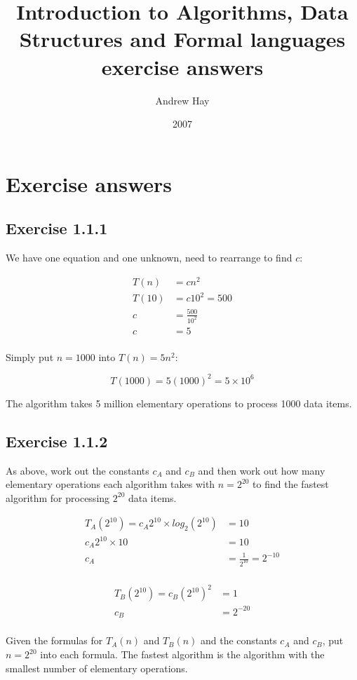 \documentclass{article}
\title{Introduction to Algorithms, Data Structures and Formal languages exercise answers}
\author{Andrew Hay}
\date{2007}
\begin{document}
\section{Exercise answers}

\subsection*{Exercise 1.1.1}

We have one equation and one unknown, need to rearrange to find \(c\):

\begin{align*}
T(n) &= c n^2 \\
T(10) &= c  10^2=500\\
c &= \frac{500}{10^2} \\
c &= 5 \\
\end{align*}

Simply put \(n=1000\) into \(T(n)=5n^2\):

\[T(1000)=5(1000)^2=5\times10^6\]

The algorithm takes 5 million elementary operations to process 1000 data items.



\subsection*{Exercise 1.1.2}

As above, work out the constants \(c_A\) and \(c_B\) and then work out how many elementary operations each algorithm takes with \(n=2^{20}\) to find the fastest algorithm for processing \(2^{20}\) data items.

\begin{align*}
T_A(2^{10})=c_A 2^{10} \times log_2(2^{10}) &= 10 \\ 
c_A  2^{10} \times 10 &= 10 \\
c_A &= \frac{1}{2^{10}} = 2^{-10} \\
\end{align*}

\begin{align*}
T_B(2^{10})=c_B  (2^{10})^2 &= 1 \\
c_B &= 2^{-20} \\
\end{align*}


Given the formulas for \(T_A(n)\) and \(T_B(n)\) and the constants \(c_A\) and \(c_B\), put \(n=2^{20}\) into each formula. The fastest algorithm is the algorithm with the smallest number of elementary operations.
\end{document}
